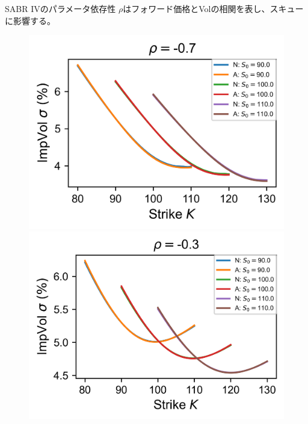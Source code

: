 \documentclass[dvipdfmx,9pt]{beamer}
\begin{document}
\begin{frame}{SABR IVのパラメータ依存性}
  $\rho$はフォワード価格とVolの相関を表し、スキューに影響する。
  \begin{figure}
    \begin{minipage}[b]{0.48\linewidth}
      \raggedleft
      \includegraphics[width=0.7\linewidth]{image/corr/SABR_graph_-0.7.png}
    \end{minipage}
    \hfill
    \begin{minipage}[b]{0.48\linewidth}
      \raggedright
      \includegraphics[width=0.7\linewidth]{image/corr/SABR_graph_-0.3.png}
    \end{minipage}
  \end{figure}


\end{frame}
\end{document}
